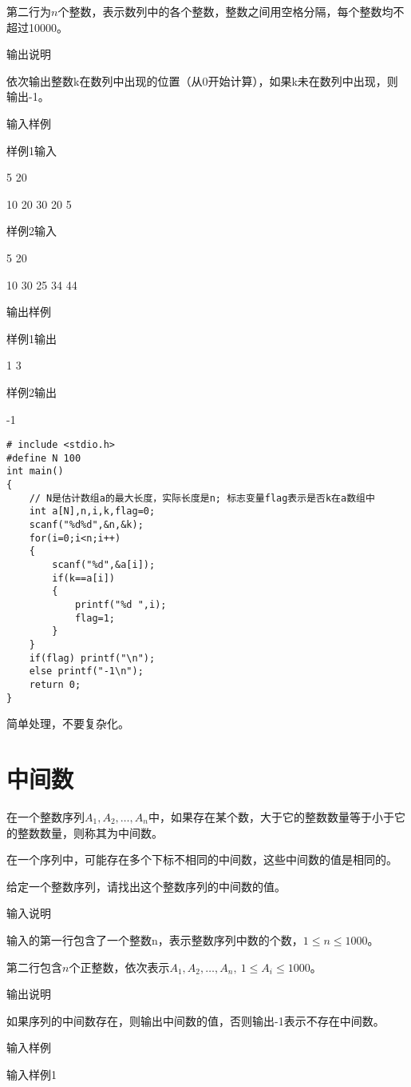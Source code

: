 第二行为$n$个整数，表示数列中的各个整数，整数之间用空格分隔，每个整数均不超过10000。

输出说明	

依次输出整数k在数列中出现的位置（从0开始计算），如果k未在数列中出现，则输出-1。

输入样例

样例1输入
	
5 20

10 20 30 20 5

样例2输入

5 20

10 30 25 34 44

输出样例
	
样例1输出

1 3

样例2输出

-1

\begin{lstlisting}
# include <stdio.h>
#define N 100
int main()
{
	// N是估计数组a的最大长度，实际长度是n; 标志变量flag表示是否k在a数组中
	int a[N],n,i,k,flag=0; 
	scanf("%d%d",&n,&k);
	for(i=0;i<n;i++)
	{
		scanf("%d",&a[i]);
		if(k==a[i]) 
		{
			printf("%d ",i);
			flag=1;
		}
	} 
	if(flag) printf("\n");
	else printf("-1\n");
	return 0;
}
\end{lstlisting}

\begin{note}[要点]
	简单处理，不要复杂化。
\end{note}

\section{中间数}
在一个整数序列$A_1, A_2,\dots, A_n$中，如果存在某个数，大于它的整数数量等于小于它的整数数量，则称其为中间数。

在一个序列中，可能存在多个下标不相同的中间数，这些中间数的值是相同的。 

给定一个整数序列，请找出这个整数序列的中间数的值。 

输入说明

输入的第一行包含了一个整数n，表示整数序列中数的个数，$1\le n\le 1000$。
 
第二行包含$n$个正整数，依次表示$A_1, A_2, \dots, A_n,~1\le A_i\le 1000$。 

输出说明

如果序列的中间数存在，则输出中间数的值，否则输出-1表示不存在中间数。

输入样例

输入样例1 

